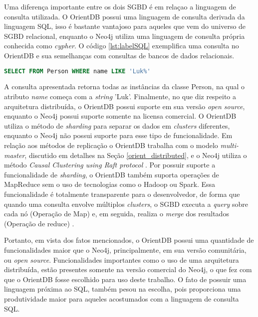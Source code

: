 	Uma diferença importante entre os dois SGBD é em relaçao a linguagem de consulta utilizada. O OrientDB possui uma linguagem de consulta derivada da linguagem SQL, isso é bastante vantajoso para aqueles que vem do universo de SGBD relacional, enquanto o Neo4j utiliza uma linguagem de consulta própria conhecida como \textit{cypher}. O código \ref{lst:labelSQL} exemplifica uma consulta no OrientDB e sua semelhanças com consultas de bancos de dados relacionais.
	
\begin{lstlisting}[label={lst:labelSQL}, caption={Exemplo de Consulta no SGBD OrientDB.},captionpos=b, language=sql]
SELECT FROM Person WHERE name LIKE 'Luk%'
\end{lstlisting}

	A consulta apresentada retorna todas as instâncias da classe Person, na qual o atributo \textit{name} começa com a \textit{string} 'Luk'. Finalmente, no que diz respeito a arquitetura distribuída, o OrientDB possui suporte em sua versão \textit{open source}, enquanto o Neo4j possui suporte somente na licensa comercial. O OrientDB utiliza o método de \textit{sharding} para separar os dados em \textit{clusters} diferentes, enquanto o Neo4j não possui suporte para esse tipo de funcionalidade. Em relação aos métodos de replicação o OrientDB trabalha com o modelo \textit{multi-master}, discutido em detalhes na Seção \ref{orient_distributed}, e o Neo4j utiliza o método \textit{Causal Clustering using Raft protocol} \cite{neo4jcausal}. Por possuir suporte a funcionalidade de \textit{sharding}, o OrientDB também suporta operações de MapReduce sem o uso de tecnologias como o Hadoop ou Spark. Essa funcionalidade é totalmente transparente para o desenvolvedor, de forma que quando uma consulta envolve múltiplos \textit{clusters}, o SGBD executa a \textit{query} sobre cada nó (Operação de Map) e, em seguida, realiza o \textit{merge} dos resultados (Operação de reduce) \cite{orientMapReduce}.	

	Portanto, em vista dos fatos mencionados, o OrientDB possui uma quantidade de funcionalidades maior que o Neo4j, principalmente, em sua versão comunitária, ou \textit{open source}. Funcionalidades importantes como o uso de uma arquitetura distribuída, estão presentes somente na versão comercial do Neo4j, o que fez com que o OrientDB fosse escolhido para uso deste trabalho. O fato de possuir uma linguagem próxima ao SQL, também pesou na escolha, pois proporciona uma produtividade maior para aqueles acostumados com a linguagem de consulta SQL.
	
